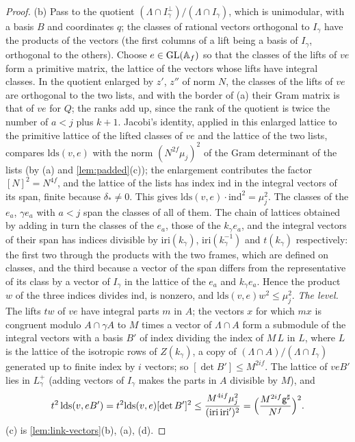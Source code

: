 \begin{proof}
(b) Pass to the quotient $(\Lambda\cap I_\gamma^\perp)/(\Lambda\cap I_\gamma)$, which is unimodular, with a basis $B$ and coordinates $q$; the classes of rational vectors orthogonal to $I_\gamma$ have the products of the
vectors (the first columns of a lift being a basis of $I_\gamma$, orthogonal to the others). Choose $e\in\operatorname{GL}(\mathbb{A}_f)$ so that the classes of the lifts of $ve$ form a primitive matrix, the lattice of the vectors whose lifts have
integral classes. In the quotient enlarged by $z'$, $z''$ of norm $N$, the classes of the lifts of $ve$ are orthogonal to the two lists, and with the border of (a) their Gram matrix is that of $ve$ for $Q$; the ranks add up,
since the rank of the quotient is twice the number of $a<j$ plus $k+1$. Jacobi's identity, applied in this enlarged lattice to the primitive lattice of the lifted classes of $ve$ and the lattice of the two lists,
compares $\mathrm{lds}(v,e)$ with the norm $(N^{2f}\mu_j)^2$ of the Gram determinant of the lists (by (a) and \cref{lem:padded}(c)); the enlargement contributes the factor $[N]^2=N^{4f}$, and the lattice of the lists has
index $\mathrm{ind}$ in the integral vectors of its span, finite because $\delta_*\ne0$. This gives $\mathrm{lds}(v,e)\cdot\mathrm{ind}^2=\mu_j^2$. The classes of the $e_a$, $\gamma e_a$ with $a<j$ span the classes of all of them. The chain of lattices obtained by adding in turn the classes of the $e_a$, those of the $k_\gamma e_a$, and the integral vectors of their span has indices divisible by
$\mathrm{iri}(k_\gamma)$, $\mathrm{iri}(k_\gamma^{-1})$ and $t(k_\gamma)$ respectively: the first two through the products with the two frames, which are defined on classes, and the third because a vector of the span differs
from the representative of its class by a vector of $I_\gamma$ in the lattice of the $e_a$ and $k_\gamma e_a$. Hence the product $w$ of the three indices divides $\mathrm{ind}$, is nonzero, and
$\mathrm{lds}(v,e)w^2\le\mu_j^2$. \emph{The level.} The lifts $tw$ of $ve$ have integral parts $m$ in $A$; the vectors $x$ for which $m x$ is congruent modulo $A\cap\gamma A$ to $M$ times a vector of $\Lambda\cap A$ form a
submodule of the integral vectors with a basis $B'$ of index dividing the index of $M\,L$ in $L$, where $L$ is the lattice of the isotropic rows of $Z(k_\gamma)$, a copy of $(\Lambda\cap A)/(\Lambda\cap I_\gamma)$ generated up to finite index by
$i$ vectors; so $[\det B']\le M^{2if}$. The lattice of $veB'$ lies in $L^+_\gamma$ (adding vectors of $I_\gamma$ makes the parts in $A$ divisible by $M$), and
\[
  t^2\,\mathrm{lds}(v,eB')=t^2\mathrm{lds}(v,e)[\det B']^2\le\frac{M^{4if}\mu_j^2}{(\mathrm{iri}\,\mathrm{iri}')^2}=\Bigl(\frac{M^{2if}\mathsf g^\sharp}{N^f}\Bigr)^2.
\]
(c) is \cref{lem:link-vectors}(b), (a), (d).
\end{proof}

